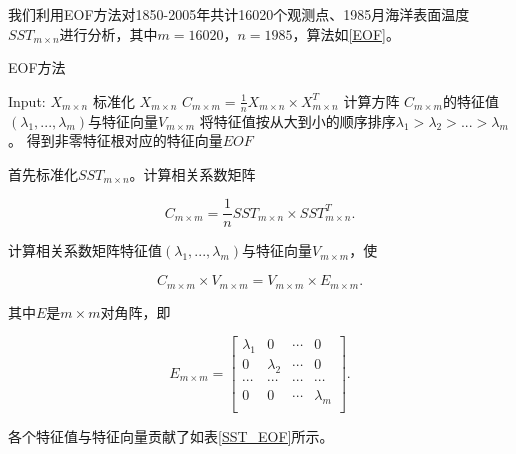 \documentclass[bwprint]{gmcmthesis}
\begin{document}
我们利用EOF方法对1850-2005年共计16020个观测点、1985月海洋表面温度$SST_{m \times n}$进行分析，其中$m=16020$，$n=1985$，算法如\ref{EOF}。

\begin{algorithm}[ht]
\caption{EOF方法}
\label{EOF}
\begin{algorithmic}[1]
\State Input: $X_{m \times n}$ 
\State 标准化 $X_{m \times n}$ 
\State $C_{m \times m} = \frac{1}{n} X_{m \times n} \times X_{m \times n}^T$
\State 计算方阵 $C_{m \times m}$的特征值$(\lambda_1, ..., \lambda_m)$与特征向量$V_{m \times m}$
\State 将特征值按从大到小的顺序排序$\lambda_1 > \lambda_2 > ... > \lambda_m$。
\State 得到非零特征根对应的特征向量$EOF$
\end{algorithmic}
\end{algorithm}

首先标准化$SST_{m \times n}$。计算相关系数矩阵

\begin{equation}
C_{m \times m} = \frac{1}{n} SST_{m \times n} \times SST_{m \times n}^T.
\end{equation}

计算相关系数矩阵特征值$(\lambda_1, ..., \lambda_m)$与特征向量$V_{m \times m}$，使

\begin{equation}
C_{m \times m} \times V_{m \times m} = V_{m \times m} \times E_{m \times m}.
\end{equation}

其中$E$是$m \times m$对角阵，即

\begin{equation}
E_{m \times m} = 
    \begin{bmatrix}
    \lambda_1 & 0 & \cdots & 0 \\
    0 & \lambda_2 & \cdots & 0 \\
    \cdots & \cdots & \cdots & \cdots\\
    0 & 0 & \cdots & \lambda_m \\
    \end{bmatrix}.
\end{equation}

各个特征值与特征向量贡献了如表\ref{SST_EOF}所示。
\end{document}
